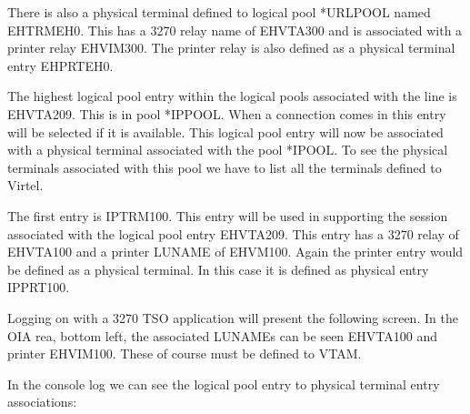 \documentclass[letterpaper,10pt,english]{sphinxmanual}
\begin{document}
\sphinxAtStartPar
{}

\sphinxAtStartPar
There is also a physical terminal defined to logical pool *URLPOOL named EHTRMEH0. This has a 3270 relay name of EHVTA300 and is associated with a printer relay EHVIM300. The printer relay is also defined as a physical terminal entry EHPRTEH0.

\sphinxAtStartPar
The highest logical pool entry within the logical pools associated with the line is EHVTA209. This is in pool *IPPOOL. When a connection comes in this entry will be selected if it is available. This logical pool entry will now be associated with a physical terminal associated with the pool *IPOOL. To see the physical terminals associated with this pool we have to list all the terminals defined to Virtel.

\sphinxAtStartPar
{}

\sphinxAtStartPar
The first entry is IPTRM100. This entry will be used in supporting the session associated with the logical pool entry EHVTA209. This entry has a 3270 relay of EHVTA100 and a printer LUNAME of EHVM100. Again the printer entry would be defined as a physical terminal. In this case it is defined as physical entry IPPRT100.

\sphinxAtStartPar
{}

\sphinxAtStartPar
Logging on with a 3270 TSO application will present the following screen. In the OIA rea, bottom left, the associated LUNAMEs can be seen \sphinxhyphen{} EHVTA100 and printer EHVIM100. These of course must be defined to VTAM.

\sphinxAtStartPar
{}

\sphinxAtStartPar
In the console log we can see the logical pool entry to physical terminal entry associations:\sphinxhyphen{}
\end{document}
